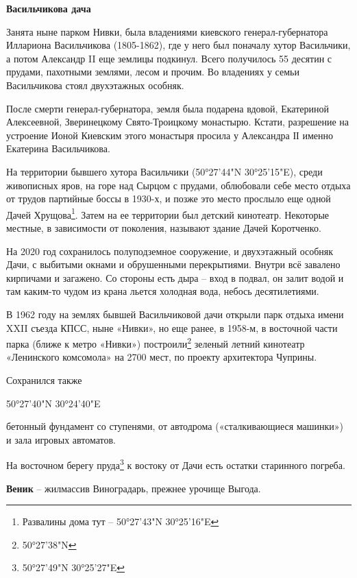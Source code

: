 \textbf{Васильчикова дача}

Занята ныне парком Нивки, была владениями киевского генерал-губернатора Иллариона Васильчикова (1805-1862), где у него был поначалу хутор Васильчики, а потом Александр II еще землицы подкинул. Всего получилось 55 десятин с прудами, пахотными землями, лесом и прочим. Во владениях у семьи Васильчикова стоял двухэтажных особняк.
 
После смерти генерал-губернатора, земля была подарена вдовой, Екатериной Алексеевной, Зверинецкому Свято-Троицкому монастырю. Кстати, разрешение на устроение Ионой Киевским этого монастыря просила у Александра ІІ именно Екатерина Васильчикова.


На территории бывшего хутора Васильчики (50°27'44"N 30°25'15"E), среди живописных яров, на горе над Сырцом с прудами, облюбовали себе место отдыха от трудов партийные боссы в 1930-х, и позже это место прослыло еще одной Дачей Хрущова\footnote{Развалины дома тут – 50°27'43"N 30°25'16"E}. Затем на ее территории был детский кинотеатр. Некоторые местные, в зависимости от поколения, называют здание Дачей Коротченко.

На 2020 год сохранилось полуподземное сооружение, и двухэтажный особняк Дачи, с выбитыми окнами и обрушенными перекрытиями. Внутри всё завалено кирпичами и загажено. Со стороны есть дыра – вход в подвал, он залит водой и там каким-то чудом из крана льется холодная вода, небось десятилетиями.

В 1962 году на землях бывшей Васильчиковой дачи открыли парк отдыха имени XXII съезда КПСС, ныне «Нивки», но еще ранее, в 1958-м, в восточной части парка (ближе к метро «Нивки») построили\footnote{50°27'38"N} зеленый летний кинотеатр «Ленинского комсомола» на 2700 мест, по проекту архитектора Чуприны. 

Сохранился также 

50°27'40"N   30°24'40"E

бетонный фундамент со ступенями, от автодрома («сталкивающиеся машинки») и зала игровых автоматов.

На восточном берегу пруда\footnote{50°27'49"N 30°25'27"E} к востоку от Дачи есть остатки старинного погреба.\\  

\medskip

\textbf{Веник} – жилмассив Виноградарь, прежнее урочище Выгода.\\

